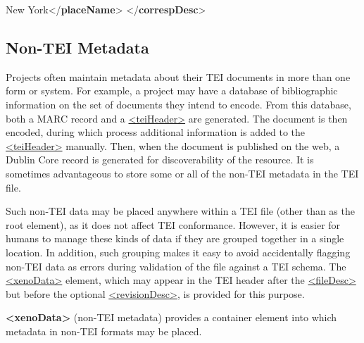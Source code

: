 \begin{shaded}
\hspace*{1em}\mbox{}\newline 
\hspace*{1em}New York{</\textbf{placeName}>}\mbox{}\newline 
{}\mbox{}\newline 
{</\textbf{correspDesc}>}\end{shaded}\egroup\par 
\subsection[{Non-TEI Metadata}]{Non-TEI Metadata}\label{HD9}\par
Projects often maintain metadata about their TEI documents in more than one form or system. For example, a project may have a database of bibliographic information on the set of documents they intend to encode. From this database, both a MARC record and a \hyperref[TEI.teiHeader]{<teiHeader>} are generated. The document is then encoded, during which process additional information is added to the \hyperref[TEI.teiHeader]{<teiHeader>} manually. Then, when the document is published on the web, a Dublin Core record is generated for discoverability of the resource. It is sometimes advantageous to store some or all of the non-TEI metadata in the TEI file.\par
Such non-TEI data may be placed anywhere within a TEI file (other than as the root element), as it does not affect TEI conformance. However, it is easier for humans to manage these kinds of data if they are grouped together in a single location. In addition, such grouping makes it easy to avoid accidentally flagging non-TEI data as errors during validation of the file against a TEI schema. The \hyperref[TEI.xenoData]{<xenoData>} element, which may appear in the TEI header after the \hyperref[TEI.fileDesc]{<fileDesc>} but before the optional \hyperref[TEI.revisionDesc]{<revisionDesc>}, is provided for this purpose. 
\begin{sansreflist}
  
\item [\textbf{<xenoData>}] (non-TEI metadata) provides a container element into which metadata in non-TEI formats may be placed.
\end{sansreflist}
